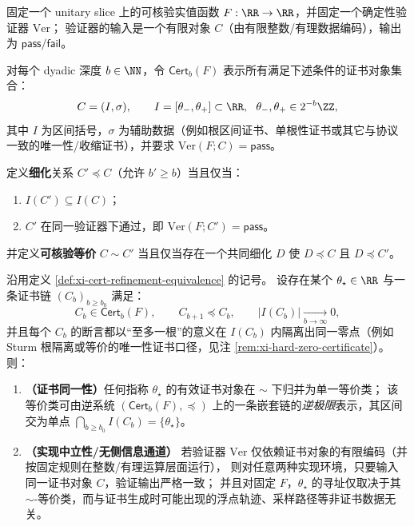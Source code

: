 \begin{definition}\label{def:xi-cert-refinement-equivalence}
固定一个 unitary slice 上的可核验实值函数 \(F:\RR\to\RR\)，并固定一个确定性验证器 \(\mathrm{Ver}\)；
验证器的输入是一个有限对象 \(C\)（由有限整数/有理数据编码），输出为 \(\mathsf{pass}/\mathsf{fail}\)。
\par
对每个 dyadic 深度 \(b\in\NN\)，令 \(\mathsf{Cert}_b(F)\) 表示所有满足下述条件的证书对象集合：
\[
C=(I,\sigma),\qquad I=[\theta_{-},\theta_{+}]\subset\RR,\ \ \theta_{-},\theta_{+}\in 2^{-b}\ZZ,
\]
其中 \(I\) 为区间括号，\(\sigma\) 为辅助数据（例如根区间证书、单根性证书或其它与协议一致的唯一性/收缩证书），并要求
\(
\mathrm{Ver}(F;C)=\mathsf{pass}
\)。
\par
定义\textbf{细化}关系 \(C'\preceq C\)（允许 \(b'\ge b\)）当且仅当：
\begin{enumerate}
  \item \(I(C')\subseteq I(C)\)；
  \item \(C'\) 在同一验证器下通过，即 \(\mathrm{Ver}(F;C')=\mathsf{pass}\)。
\end{enumerate}
并定义\textbf{可核验等价} \(C\sim C'\) 当且仅当存在一个共同细化 \(D\) 使 \(D\preceq C\) 且 \(D\preceq C'\)。
\end{definition}

\begin{theorem}[精度一致性的逆极限归并与实现中立性]\label{thm:xi-cert-inverse-limit-coherence}
沿用定义 \ref{def:xi-cert-refinement-equivalence} 的记号。
设存在某个 \(\theta_\star\in\RR\) 与一条证书链 \((C_b)_{b\ge b_0}\) 满足：
\[
C_{b}\in\mathsf{Cert}_b(F),\qquad C_{b+1}\preceq C_{b},\qquad \bigl|I(C_b)\bigr|\xrightarrow[b\to\infty]{}0,
\]
并且每个 \(C_b\) 的断言都以“至多一根”的意义在 \(I(C_b)\) 内隔离出同一零点（例如 Sturm 根隔离或等价的唯一性证书口径，见注 \ref{rem:xi-hard-zero-certificate}）。
则：
\begin{enumerate}
  \item \textbf{（证书同一性）}任何指称 \(\theta_\star\) 的有效证书对象在 \(\sim\) 下归并为单一等价类；
  该等价类可由逆系统 \((\mathsf{Cert}_b(F),\preceq)\) 上的一条嵌套链的\emph{逆极限}表示，其区间交为单点 \(\bigcap_{b\ge b_0} I(C_b)=\{\theta_\star\}\)。
  \item \textbf{（实现中立性/无侧信息通道）}
  若验证器 \(\mathrm{Ver}\) 仅依赖证书对象的有限编码（并按固定规则在整数/有理运算层面运行），
  则对任意两种实现环境，只要输入同一证书对象 \(C\)，验证输出严格一致；
  并且对固定 \(F\)，\(\theta_\star\) 的寻址仅取决于其 \(\sim\)-等价类，而与证书生成时可能出现的浮点轨迹、采样路径等非证书数据无关。
\end{enumerate}
\end{theorem}

